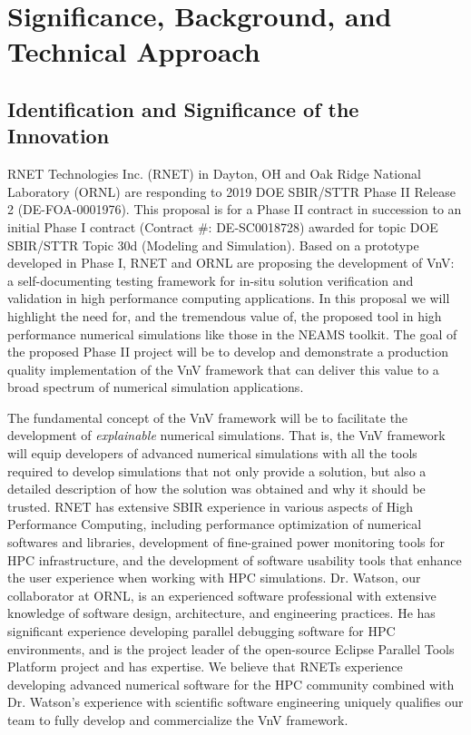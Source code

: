 


\section{Significance, Background, and Technical Approach}

\subsection{Identification and Significance of the Innovation}
\label{sec:identification}

RNET Technologies Inc. (RNET) in Dayton, OH and Oak Ridge National Laboratory 
(ORNL) are responding to 2019 DOE SBIR/STTR Phase II Release 2 
(DE-FOA-0001976). This proposal is for a Phase II contract in succession to an 
initial Phase I contract (Contract \#: DE-SC0018728) awarded for topic DOE 
SBIR/STTR Topic 30d (Modeling and Simulation). Based on a prototype developed in Phase I, RNET and ORNL are proposing the development of VnV: a self-documenting 
testing framework for in-situ solution verification and validation in high performance computing applications. In this proposal we will highlight the need for, and the tremendous value of, the proposed tool in high performance numerical simulations like those in the NEAMS toolkit. The goal of the proposed Phase II project will be to develop and demonstrate a production quality implementation of the VnV framework that can deliver this value to a broad spectrum of numerical simulation applications. 

The fundamental concept of the VnV framework will be to facilitate the development of \emph{explainable} numerical simulations. That is, the VnV framework will equip developers of advanced numerical simulations with all the tools required to develop simulations that not only provide a solution, but also a detailed description of how the solution was obtained and why it should be trusted. RNET has extensive SBIR experience in various aspects of High Performance Computing, including performance optimization of numerical softwares and libraries, development of fine-grained power monitoring tools for HPC infrastructure, and the development of software usability tools that enhance the user experience when working with HPC simulations. Dr. Watson, our collaborator at ORNL, is an experienced software professional with extensive knowledge of software design, architecture, and engineering practices. He has significant experience developing parallel debugging software for HPC environments, and  is the project leader of the open-source Eclipse Parallel Tools Platform project and has expertise. We believe that RNETs experience developing advanced numerical software for the HPC community combined with Dr. Watson's experience with scientific software engineering uniquely qualifies our team to fully develop and commercialize the VnV framework.

